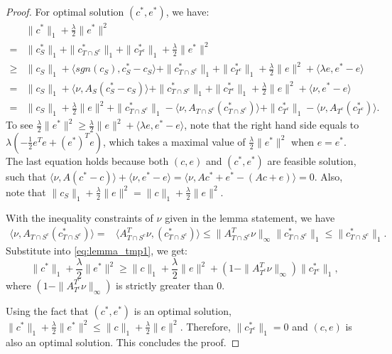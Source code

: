 \documentclass[twoside,11pt]{article}
\numberwithin{equation}{section}
\begin{document}
\begin{proof}
For optimal solution $(c^{*},e^{*})$, we have:
\begin{align}
    &\|c^*\|_1+\frac{\lambda}{2}\|e^*\|^2 \nonumber\\
    =& \|c^*_S\|_1+\|c^*_{T\cap S^c}\|_1+\|c^*_{T^c}\|_1 + \frac{\lambda}{2} \|e^*\|^2\nonumber\\
    \geq&\|c_S\|_1+\langle sgn(c_S),c^*_S-c_S\rangle+\|c^*_{T\cap S^c}\|_1+\|c^*_{T^c}\|_1
    +\frac{\lambda}{2} \|e\|^2 +\langle \lambda e,e^*-e\rangle\nonumber\\
    =&\|c_S\|_1+\langle \nu,A_S(c^*_S-c_S)\rangle+\|c^*_{T\cap S^c}\|_1+\|c^*_{T^c}\|_1
    +\frac{\lambda}{2} \|e\|^2 +\langle \nu,e^*-e\rangle\nonumber\\
    =&\|c_S\|_1+\frac{\lambda}{2} \|e\|^2+ \|c^*_{T\cap S^c}\|_1-\langle \nu,A_{T\cap S^c}(c^*_{T\cap S^c})\rangle
    +\|c^*_{T^c}\|_1-\langle \nu,A_{T^c}(c^*_{T^c})\rangle. \label{eq:lemma_tmp1}
\end{align}
To see $\frac{\lambda}{2} \|e^*\|^2 \geq \frac{\lambda}{2} \|e\|^2 +\langle \lambda e,e^*-e\rangle$, note that the right hand side equals to $\lambda\left(-\frac{1}{2}e^Te +(e^*)^Te\right)$, which takes a maximal value of $\frac{\lambda}{2} \|e^*\|^2$ when $e=e^*$.
 The last equation holds because both $(c,e)$ and $(c^*,e^*)$ are feasible solution, such that $\langle\nu,A(c^*-c)\rangle+\langle\nu,e^*-e\rangle = \langle\nu,Ac^*+e^*-(Ac+e)\rangle=0$. Also, note that $\|c_S\|_1+\frac{\lambda}{2} \|e\|^2=\|c\|_1+\frac{\lambda}{2} \|e\|^2$.

With the inequality constraints of $\nu$ given in the lemma statement, we have
\begin{align*}
    \langle \nu,A_{T\cap S^c}(c^*_{T\cap S^c})\rangle=&\langle A_{T\cap S^c}^T\nu,(c^*_{T\cap S^c})\rangle
    \leq \|A^T_{T\cap S^{c}}\nu\|_{\infty}\|c^*_{T\cap S^c}\|_1\leq\|c^*_{T\cap S^c}\|_1.
\end{align*}
Substitute into \eqref{eq:lemma_tmp1}, we get:
\begin{equation*}
    \|c^*\|_1+\frac{\lambda}{2} \|e^*\|^2 \geq \|c\|_1+\frac{\lambda}{2} \|e\|^2 +(1-\|A^T_{T^{c}}\nu\|_{\infty})\|c^*_{T^c}\|_1,
\end{equation*}
where $(1-\|A^T_{T^{c}}\nu\|_{\infty})$ is strictly greater than $0$.

Using the fact that $(c^*,e^*)$ is an optimal solution, $\|c^*\|_1+\frac{\lambda}{2} \|e^*\|^2\leq \|c\|_1+\frac{\lambda}{2} \|e\|^2$. Therefore, $\|c^*_{T^c}\|_1=0$ and $(c,e)$ is also an optimal solution. This concludes the proof.
\end{proof}
\end{document}
